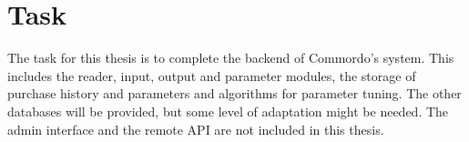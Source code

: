 
\section{Task}\label{sec:task}

The task for this thesis is to complete the backend of Commordo's system. This includes the reader, input, output and parameter modules, the storage of purchase history and parameters and algorithms for parameter tuning. The other databases will be provided, but some level of adaptation might be needed. The admin interface and the remote API are not included in this thesis.

